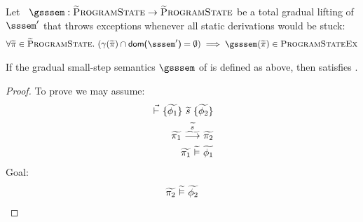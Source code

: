 Let ~$\gsssem : \setGProgramState \rightarrow \setGProgramState$ be a total gradual lifting of $\sssem'$ that throws exceptions whenever all static derivations would be stuck:
\begin{align}
\forall \grad{\pi} \in \setGProgramState.~ (\gamma(\grad{\pi}) \cap \dom{\sssem'} = \emptyset) \implies \gsssem(\grad{\pi}) \in \setProgramStateEx
\label{frm:perf-ex}
\end{align}

\begin{theorem}[]
    If the gradual small-step semantics $\gsssem$ of \gvl is defined as above, then \gvl satisfies .
\end{theorem}
\begin{proof}
    To prove  we may assume:
    \begin{align}
    \label{frm:tmp0}
    \dgthoare{}{\grad{\phi_1}}{\grad{s}}{\grad{\phi_2}}\\
    \label{frm:tmp1}
    \gsstepConsume{\grad{s}}{\grad{\pi_1}}{\grad{\pi_2}}\\
    \label{frm:tmp2}
    \evalgphiGen{\grad{\pi_1}}{\grad{\phi_1}}
    \end{align}
    Goal: 
    \begin{align}
    \label{frm:tmp3}
    \evalgphiGen{\grad{\pi_2}}{\grad{\phi_2}}
    \end{align}
    

\end{proof}
